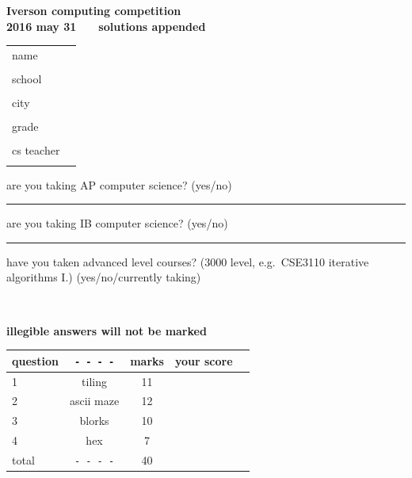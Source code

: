 \documentclass[12pt]{article}
\begin{document}
\thispagestyle{empty}

{\Large
\begin{center}
\textbf{Iverson computing competition} \\
\textbf{2016 may 31} ~ ~ \textbf{solutions appended} \\
\end{center}
}

\vspace{0.5cm}

\noindent
{\large
\begin{tabular}{ll}
name &\underline{\hspace{8cm}} \\ \\
school &\underline{\hspace{8cm}} \\ \\
city &	\underline{\hspace{4cm}}  \\ \\
grade &	\underline{\hspace{2cm}}  \\ \\
cs teacher &	\underline{\hspace{8cm}}  \\ \\
\end{tabular}
}

\bigskip

{\large 
\noindent
are you taking AP computer science? (yes/no) \rule{1cm}{.5pt}

\noindent
are you taking IB computer science? (yes/no) \rule{1cm}{.5pt}

\medskip

\noindent have you taken advanced level courses? 
(3000 level, e.g.\ CSE3110 iterative algorithms I.)
(yes/no/currently taking) \rule[0mm]{0mm}{6mm} \ \ \hrulefill \ \ 
}

\vfill


\begin{center}
\bf \large
\noindent illegible answers will not be marked

\end{center}

\vfill
 
\begin{large}
\begin{center}
\begin{tabular}{|l|c|c|c|c|} \hline
question	& \verb+- - - -+& marks & your score     \\ \hline
1 \rule[-3mm]{0mm}{10mm}	& tiling &11& \\ \hline
2 \rule[-3mm]{0mm}{10mm}	& ascii maze &12& \\ \hline
3 \rule[-3mm]{0mm}{10mm}        & blorks &10&  \\ \hline
4 \rule[-3mm]{0mm}{10mm}	& hex & 7 & \\ \hline
total \rule[-3mm]{0mm}{10mm}	& \verb+- - - -+&40&\\ \hline
\end{tabular}
\end{center}
\end{large}
\end{document}
